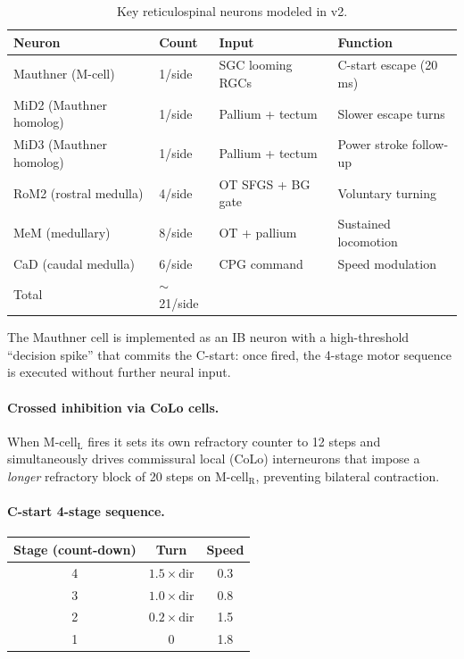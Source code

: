 \documentclass[11pt,a4paper]{article}
\begin{document}
\begin{table}[H]
\centering
\caption{Key reticulospinal neurons modeled in v2.}
\label{tab:rs_neurons}
\begin{tabular}{llll}
\toprule
Neuron & Count & Input & Function \\
\midrule
Mauthner (M-cell)      & 1/side & SGC looming RGCs  & C-start escape (20\,ms) \\
MiD2 (Mauthner homolog) & 1/side & Pallium + tectum  & Slower escape turns \\
MiD3 (Mauthner homolog) & 1/side & Pallium + tectum  & Power stroke follow-up \\
RoM2 (rostral medulla)  & 4/side & OT SFGS + BG gate & Voluntary turning \\
MeM (medullary)         & 8/side & OT + pallium      & Sustained locomotion \\
CaD (caudal medulla)    & 6/side & CPG command       & Speed modulation \\
\midrule
Total & $\sim$21/side & & \\
\bottomrule
\end{tabular}
\end{table}

The Mauthner cell is implemented as an IB neuron with a high-threshold
``decision spike'' that commits the C-start: once fired, the 4-stage motor
sequence is executed without further neural input.

\paragraph{Crossed inhibition via CoLo cells.}
When M-cell$_\text{L}$ fires it sets its own refractory counter to 12 steps
and simultaneously drives commissural local (CoLo) interneurons that impose
a \emph{longer} refractory block of 20 steps on M-cell$_\text{R}$, preventing
bilateral contraction.

\paragraph{C-start 4-stage sequence.}
\begin{center}
\begin{tabular}{ccc}
\toprule
Stage (count-down) & Turn & Speed \\
\midrule
4 & $1.5 \times \text{dir}$ & 0.3 \\
3 & $1.0 \times \text{dir}$ & 0.8 \\
2 & $0.2 \times \text{dir}$ & 1.5 \\
1 & 0                       & 1.8 \\
\bottomrule
\end{tabular}
\end{center}
\end{document}
